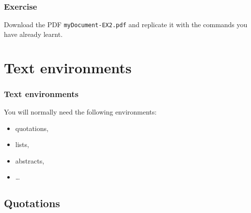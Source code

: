 \begin{frame}[fragile]
\frametitle{Exercise}

Download the PDF \alert{\texttt{myDocument-EX2.pdf}} and replicate it with the commands you have already learnt.

\end{frame}


\section{Text environments}


\begin{frame}[fragile]
\frametitle{Text environments}
You will normally need the following environments:

\begin{itemize}
	\item quotations,
	
	\item lists, 
	
	
	\item abstracts,
	
	\item \dots 
\end{itemize}

\end{frame}


\subsection{Quotations}

